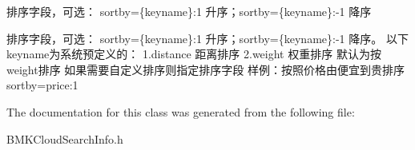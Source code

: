 排序字段，可选： sortby=\{keyname\}\-:1 升序；sortby=\{keyname\}\-:-\/1 降序 

排序字段，可选： sortby=\{keyname\}\-:1 升序；sortby=\{keyname\}\-:-\/1 降序。 以下keyname为系统预定义的： 1.\-distance 距离排序 2.\-weight 权重排序 默认为按weight排序 如果需要自定义排序则指定排序字段 样例：按照价格由便宜到贵排序sortby=price\-:1 

The documentation for this class was generated from the following file\-:\begin{DoxyCompactItemize}
\item 
B\-M\-K\-Cloud\-Search\-Info.\-h\end{DoxyCompactItemize}
